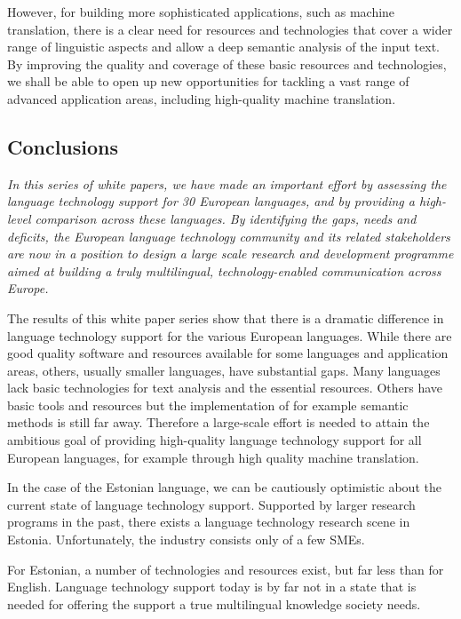 \documentclass[]{../metanetpaper}
\begin{document}
\begin{multicols}{2}
However, for building more sophisticated applications, such as machine translation, there is a clear need for resources and technologies that cover a wider range of linguistic aspects and allow a deep semantic analysis of the input text. 
By improving the quality and coverage of these basic resources and technologies, we shall be able to open up new opportunities for tackling a vast range of advanced application areas, including high-quality machine translation.


\subsection{Conclusions}

\emph{In this series of white papers, we have made an important effort by assessing the language technology support for 30 European languages, and by providing a high-level comparison across these languages. By identifying the gaps, needs and deficits, the European language technology community and its related stakeholders are now in a position to design a large scale research and development programme aimed at building a truly multilingual, technology-enabled communication across Europe.}

The results of this white paper series show that there is a dramatic difference in language technology support for the various European languages. While there are good quality software and resources available for some languages and application areas, others, usually smaller languages, have substantial gaps. Many languages lack basic technologies for text analysis and the essential resources. Others have basic tools and resources but the implementation of for example semantic methods is still far away. Therefore a large-scale effort is needed to attain the ambitious goal of providing high-quality language technology support for all European languages, for example through high quality machine translation. 

In the case of the Estonian language, we can be cautiously optimistic about the current state of language technology support. Supported by larger research programs in the past, there exists a language technology research scene in Estonia. Unfortunately, the industry consists only of a few SMEs.

For Estonian, a number of technologies and resources exist, but far less than for English. 
Language technology support today is by far not in a state that is needed for offering the support a true multilingual knowledge society needs.


\end{multicols}
\end{document}
